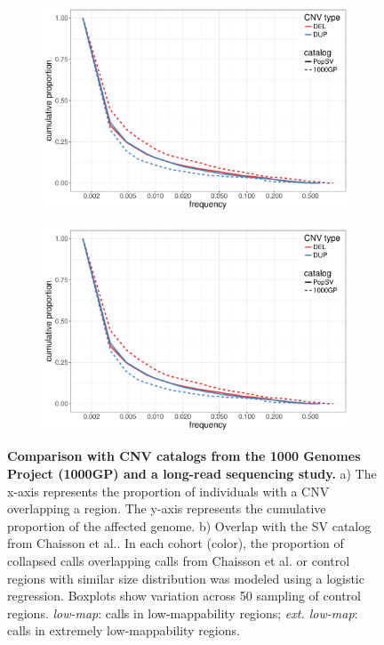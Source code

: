 \begin{figure}[htp]
  \centering
  \begin{subfigure}{.49\textwidth}
    \includegraphics[width=\linewidth,page=1]{figures/PopSV-catalog-overview.pdf}
    \caption{}
    \label{fig:freq1kgp}
  \end{subfigure}
  \begin{subfigure}{.49\textwidth}
    \includegraphics[width=\linewidth,page=2]{figures/PopSV-catalog-overview.pdf}
    \caption{}
    \label{fig:chaisson}
  \end{subfigure}
  \caption[Comparison with CNV catalogs from the 1000 Genomes Project and a long-read sequencing study]{{\bf Comparison with CNV catalogs from the 1000 Genomes Project\cite{Sudmant2015a} (1000GP) and a long-read sequencing study\cite{Chaisson2014}.} {\small a) The x-axis represents the proportion of individuals with a CNV overlapping a region. The y-axis represents the cumulative proportion of the affected genome. b) Overlap with the SV catalog from Chaisson et al.\cite{Chaisson2014}. In each cohort (color), the proportion of collapsed calls overlapping calls from Chaisson et al.\cite{Chaisson2014} or control regions with similar size distribution was modeled using a logistic regression. Boxplots show variation across 50 sampling of control regions. {\it low-map}: calls in low-mappability regions; {\it ext. low-map}: calls in extremely low-mappability regions.}}
\end{figure}
